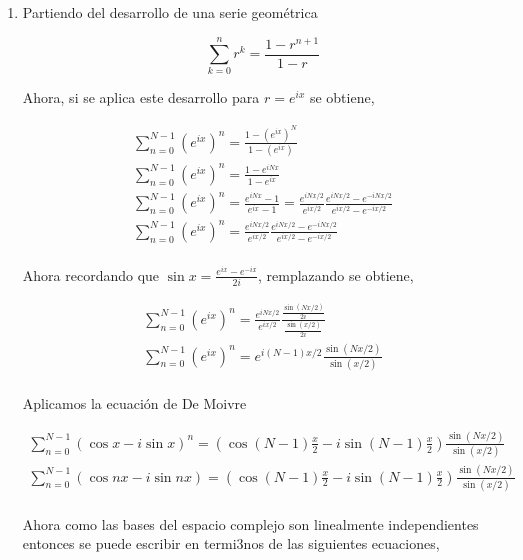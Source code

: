 \documentclass[12pt,spanish]{article}
\begin{document}
\begin{enumerate}
    \item Partiendo del desarrollo de una serie geométrica 
    
        \begin{equation*}
            \sum_{k = 0}^{n} r^{k} = \frac{1 - r^{n+1}}{1 - r}
        \end{equation*}


        Ahora, si se aplica este desarrollo para $r = e^{ix}$ se obtiene,

        \begin{gather*}
            \sum_{n = 0}^{N-1} (e^{ix})^{n} = \frac{1 - (e^{ix})^{N}}{1 - (e^{ix})}\\
            \sum_{n = 0}^{N-1} (e^{ix})^{n} = \frac{1 - e^{iNx}}{1 - e^{ix}}\\
            \sum_{n = 0}^{N-1} (e^{ix})^{n} = \frac{e^{iNx} - 1}{e^{ix} - 1} = \frac{e^{iNx/2}}{e^{ix/2}} \frac{e^{iNx/2} - e^{-iNx/2}}{e^{ix/2} - e^{-ix/2}}\\
            \sum_{n = 0}^{N-1} (e^{ix})^{n} = \frac{e^{iNx/2}}{e^{ix/2}} \frac{e^{iNx/2} - e^{-iNx/2}}{e^{ix/2} - e^{-ix/2}}\\
        \end{gather*}

        Ahora recordando que $\sin{x} = \frac{e^{ix} - e^{-ix}}{2i}$, remplazando se obtiene,

        \begin{gather*}
            \sum_{n = 0}^{N-1} (e^{ix})^{n} = \frac{e^{iNx/2}}{e^{ix/2}} \frac{\frac{\sin(Nx/2)}{2i}}{\frac{\sin(x/2)}{2i}}\\
            \sum_{n = 0}^{N-1} (e^{ix})^{n} = e^{i(N-1)x/2} \frac{\sin(Nx/2)}{\sin(x/2)}\\
        \end{gather*}

        Aplicamos la ecuación de De Moivre

        \begin{gather*}
            \sum_{n = 0}^{N-1} \left(\cos{x} - i\sin{x}\right)^{n} = \left(\cos(N-1)\frac{x}{2} - i\sin(N-1)\frac{x}{2}\right)  \frac{\sin(Nx/2)}{\sin(x/2)}\\
            \sum_{n = 0}^{N-1} \left(\cos{nx} - i\sin{nx}\right) = \left(\cos(N-1)\frac{x}{2} - i\sin(N-1)\frac{x}{2}\right) \frac{\sin(Nx/2)}{\sin(x/2)}\\
        \end{gather*}

        Ahora como las bases del espacio complejo son linealmente independientes entonces se puede escribir en termi3nos de las siguientes ecuaciones,


\end{enumerate}
\end{document}

